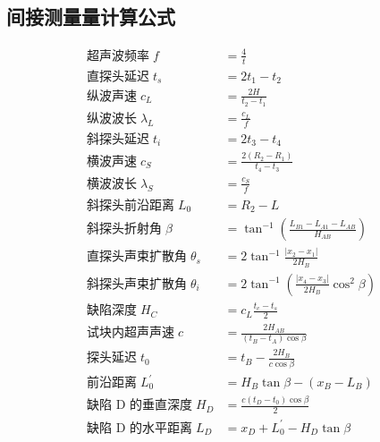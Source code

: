\documentclass[a4paper,utf8]{article}
\begin{document}
\subsection{间接测量量计算公式\label{sss:formula}}
\begin{align*}
    \text{超声波频率}\; f&=\frac 4 t \\
    \text{直探头延迟}\; t_s&=2t_1-t_2 \\
    \text{纵波声速}\; c_L&=\frac{2H}{t_2-t_1} \\
    \text{纵波波长}\; \lambda_L&=\frac{c_L}{f} \\
    \text{斜探头延迟}\; t_i&=2t_3-t_4 \\
    \text{横波声速}\; c_S&=\frac{2(R_2-R_1)}{t_4-t_3} \\
    \text{横波波长}\; \lambda_S&=\frac{c_S}{f} \\
    \text{斜探头前沿距离}\; L_0&=R_2-L \\
    \text{斜探头折射角}\; \beta&=\tan^{-1}\left(\frac{L_{B1}-L_{A1}-L_{AB}}{H_{AB}}\right) \\
    \text{直探头声束扩散角}\; \theta_s&=2\tan^{-1}\frac{\left|x_2-x_1\right|}{2H_B} \\
    \text{斜探头声束扩散角}\; \theta_i&=2\tan^{-1}\left(\frac{\left|x_4-x_3\right|}{2H_B}\cos^2 \beta \right) \\ 
    \text{缺陷深度}\; H_C&=c_L\frac{t_c-t_s}{2} \\
    \text{试块内超声声速}\; c&=\frac{2H_{AB}}{(t_B-t_A)\cos \beta} \\
    \text{探头延迟}\; t_0&=t_B-\frac{2H_{B}}{c\cos \beta} \\
    \text{前沿距离}\; L_0^{'}&=H_B\tan\beta-(x_B-L_B) \\
    \text{缺陷 D 的垂直深度}\; H_D&=\frac{c(t_D-t_0)\cos\beta}{2} \\
    \text{缺陷 D 的水平距离}\; L_D&=x_D+L_0^{'}-H_D\tan\beta
\end{align*}
\end{document}
